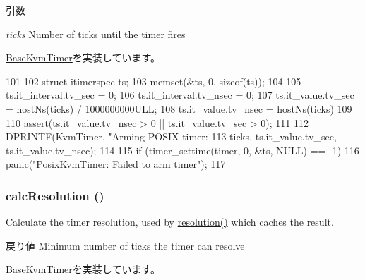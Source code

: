 \begin{DoxyParams}{引数}
\item[{\em ticks}]Number of ticks until the timer fires \end{DoxyParams}


\hyperlink{classBaseKvmTimer_af6a92c8cd2abd0bf8699cbefe1257074}{BaseKvmTimer}を実装しています。


\begin{DoxyCode}
101 {
102     struct itimerspec ts;
103     memset(&ts, 0, sizeof(ts));
104 
105     ts.it_interval.tv_sec = 0;
106     ts.it_interval.tv_nsec = 0;
107     ts.it_value.tv_sec = hostNs(ticks) / 1000000000ULL;
108     ts.it_value.tv_nsec = hostNs(ticks) %
109 
110     assert(ts.it_value.tv_nsec > 0 || ts.it_value.tv_sec > 0);
111 
112     DPRINTF(KvmTimer, "Arming POSIX timer: %
113             ticks, ts.it_value.tv_sec, ts.it_value.tv_nsec);
114 
115     if (timer_settime(timer, 0, &ts, NULL) == -1)
116         panic("PosixKvmTimer: Failed to arm timer\n");
117 }
\end{DoxyCode}
\hypertarget{classPosixKvmTimer_a02798cc202bebceef3ff0e3ff3d7b5b8}{
\subsubsection[{calcResolution}]{ calcResolution ()}}
\label{classPosixKvmTimer_a02798cc202bebceef3ff0e3ff3d7b5b8}
Calculate the timer resolution, used by \hyperlink{classBaseKvmTimer_a4450cc644b16fe4cb8b25ed02fb6446f}{resolution()} which caches the result.

\begin{DoxyReturn}{戻り値}
Minimum number of ticks the timer can resolve 
\end{DoxyReturn}


\hyperlink{classBaseKvmTimer_a8bff362cf60f8a6adbdc0aa31cb9be27}{BaseKvmTimer}を実装しています。



